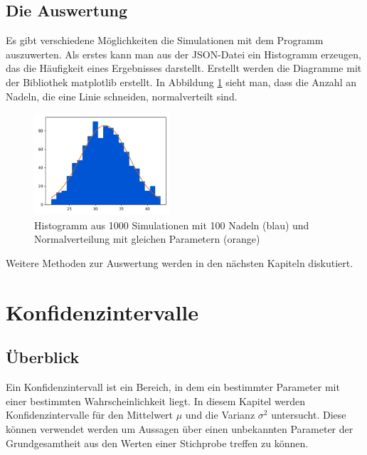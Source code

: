 \documentclass[10pt,twocolumn]{scrartcl}
\begin{document}
	\subsection{Die Auswertung}
		Es gibt verschiedene Möglichkeiten die Simulationen mit dem Programm auszuwerten. Als erstes kann man aus der JSON-Datei ein Histogramm erzeugen, das die Häufigkeit eines Ergebnisses darstellt. Erstellt werden die Diagramme mit der Bibliothek matplotlib\cite{matplotlib} erstellt. 
		In Abbildung \ref{fig:hist} sieht man, dass die Anzahl an Nadeln, die eine Linie schneiden, normalverteilt sind.

		\begin{figure}[htb]
			\centering
			\includegraphics[width=0.45\textwidth]{images/histogram_1000_no_interval_3.png}
			\caption{Histogramm aus 1000 Simulationen mit 100 Nadeln (blau) und Normalverteilung mit gleichen Parametern (orange)}
			\label{fig:hist}
		\end{figure}
		
		Weitere Methoden zur Auswertung werden in den nächsten Kapiteln diskutiert.

\section{Konfidenzintervalle}
	\subsection{Überblick}
		Ein Konfidenzintervall ist ein Bereich, in dem ein bestimmter Parameter mit einer bestimmten Wahrscheinlichkeit liegt. In diesem Kapitel werden Konfidenzintervalle für den Mittelwert $\mu$ und die Varianz $\sigma^2$ untersucht. Diese können verwendet werden um Aussagen über einen unbekannten Parameter der Grundgesamtheit aus den Werten einer Stichprobe treffen zu können.
\end{document}
